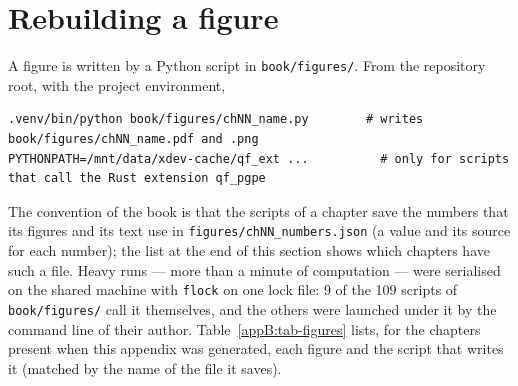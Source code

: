 \section{Rebuilding a figure}
A figure is written by a Python script in \texttt{book/\allowbreak{}figures/\allowbreak{}}. From the repository root, with the project environment,
\begin{lstlisting}[style=plainmono]
.venv/bin/python book/figures/chNN_name.py        # writes book/figures/chNN_name.pdf and .png
PYTHONPATH=/mnt/data/xdev-cache/qf_ext ...          # only for scripts that call the Rust extension qf_pgpe
\end{lstlisting}
The convention of the book is that the scripts of a chapter save the numbers that its figures and its text use in \texttt{figures/\allowbreak{}chNN\_\allowbreak{}numbers.\allowbreak{}json} (a value and its source for each number); the list at the end of this section shows which chapters have such a file. Heavy runs --- more than a minute of computation --- were serialised on the shared machine with \texttt{flock} on one lock file: 9 of the 109 scripts of \texttt{book/\allowbreak{}figures/\allowbreak{}} call it themselves, and the others were launched under it by the command line of their author. Table~\ref{appB:tab-figures} lists, for the chapters present when this appendix was generated, each figure and the script that writes it (matched by the name of the file it saves).
\begin{center}\label{appB:tab-figures}\end{center}
